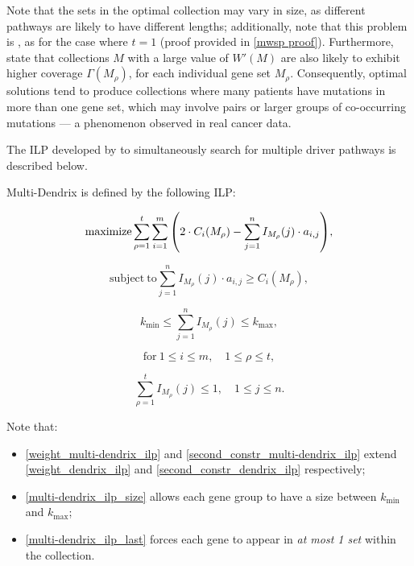 Note that the sets in the optimal collection may vary in size, as different pathways are likely to have different lengths; additionally, note that this problem is \NPComplete, as for the case where $t = 1$ (proof provided in \cref{mwsp proof}). Furthermore, \textcite{multi-dendrix} state that collections $M$ with a large value of $W'(M)$ are also likely to exhibit higher coverage $\Gamma(M_\rho)$, for each individual gene set $M_\rho$. Consequently, optimal solutions tend to produce collections where many patients have mutations in more than one gene set, which may involve pairs or larger groups of co-occurring mutations --- a phenomenon observed in real cancer data.

The ILP developed by \textcite{multi-dendrix} to simultaneously search for multiple driver pathways is described below.

\begin{definition}
    Multi-Dendrix is defined by the following ILP:

    \begin{equation} \label{weight_multi-dendrix_ilp}
        \mathrm{maximize} \sum_{\rho = 1}^t {\sum_{i = 1}^m {\left(2 \cdot C_i(M_\rho) - \sum_{j = 1}^n I_{M_\rho}(j) \cdot a_{i, j}\right)}},
    \end{equation}

    \begin{equation} \label{second_constr_multi-dendrix_ilp}
        \mathrm{subject \ to} \sum_{j = 1}^n I_{M_\rho}(j) \cdot {a_{i, j}} \ge C_i(M_\rho),
    \end{equation}

    \begin{equation} \label{multi-dendrix_ilp_size}
        k_\mathrm{min} \le \sum_{j = 1}^n {I_{M_\rho}(j)} \le k_\mathrm{max},
    \end{equation}
    
    \begin{equation*}
        \mathrm{for\ } 1 \le i \le m, \quad 1 \le \rho \le t,
    \end{equation*}

    \begin{equation} \label{multi-dendrix_ilp_last}
        \sum_{\rho = 1}^t{I_{M_\rho}(j)} \le 1, \quad 1 \le j \le n.
    \end{equation}
\end{definition}

Note that:

\begin{itemize}
    \item \cref{weight_multi-dendrix_ilp} and \cref{second_constr_multi-dendrix_ilp} extend \cref{weight_dendrix_ilp} and \cref{second_constr_dendrix_ilp} respectively;
    \item \cref{multi-dendrix_ilp_size} allows each gene group to have a size between $k_\mathrm{min}$ and $k_\mathrm{max}$;
    \item \cref{multi-dendrix_ilp_last} forces each gene to appear in \textit{at most 1 set} within the collection. 
\end{itemize}

